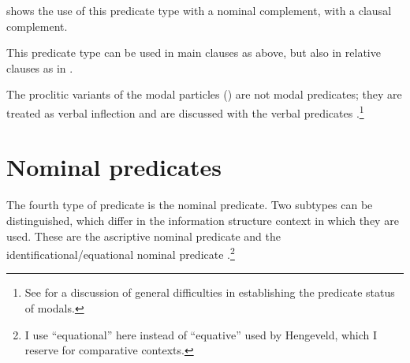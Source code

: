  shows the use of this predicate type with a nominal complement,  with a clausal complement.


 
This predicate type can be used in main clauses as above, but also in relative clauses as in .

 

The proclitic variants of the modal particles ()  are not modal predicates; they are treated as verbal inflection and are discussed with the verbal predicates .\footnote{See \citet[128]{Noonan1985} for a discussion of general difficulties in establishing the predicate status of modals.}


\section{Nominal predicates}\label{sec:pred:Nominalpredicate}

The fourth type of predicate is the nominal predicate. Two subtypes can be distinguished, which differ in the information structure context in which they are used. These are the ascriptive nominal predicate  and the identificational/equational nominal predicate   \citep[cf.][104f]{Hengeveld1992nvpttd}.\footnote{I use ``equational'' here instead of ``equative'' used by Hengeveld, which I reserve for comparative contexts.}

